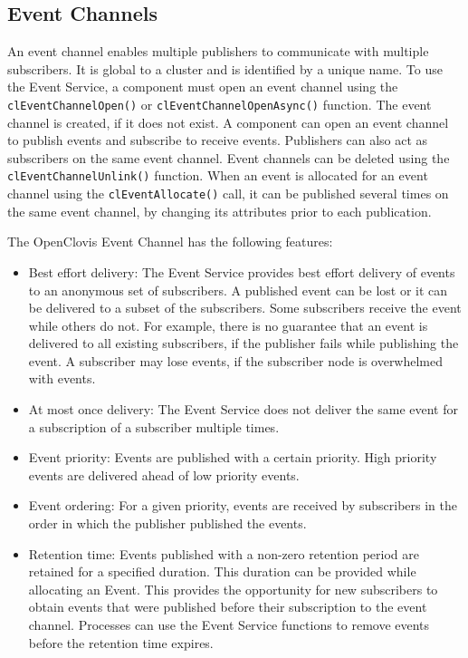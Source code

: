 \begin{flushleft}
\subsection{Event Channels}
An event channel enables multiple publishers to communicate with multiple subscribers. It is global to a cluster and is identified by a unique name. To
use the Event Service, a component must open an event channel using the {\tt{clEventChannelOpen()}} or {\tt{clEventChannelOpenAsync()}} function. The 
event channel is created, if it does not exist. A component can open an event channel to publish events and subscribe to receive events. 
Publishers can also act as subscribers on the same event channel. Event channels can be deleted using the {\tt{clEventChannelUnlink()}} function. When an 
event is allocated for an event channel using the {\tt{clEventAllocate()}} call, it can be published several times on the same event channel, by changing
its attributes prior to each publication. 
\par
The OpenClovis Event Channel has the following features:
\begin{itemize}
\item
Best effort delivery: The Event Service provides best effort delivery of events to an anonymous set of subscribers. A published event can be lost or
it can be delivered to a subset of the subscribers. Some subscribers receive the event while others do not. For example, there is no guarantee that an
event is delivered to all existing subscribers, if the publisher fails while publishing the event. A subscriber may lose events, if the subscriber node
is overwhelmed with events.
\item
At most once delivery: The Event Service does not deliver the same event for a subscription of a subscriber multiple times.
\item
Event priority: Events are published with a certain priority. High priority events are delivered ahead of low priority events. 
\item
Event ordering: For a given priority, events are received by subscribers in the order in which the publisher published the events.
\item
Retention time: Events published with a non-zero retention period are retained for a specified duration. This duration can be provided while allocating 
an Event. This provides the opportunity for new subscribers to obtain events that were published before their subscription to the event channel. Processes can
use the Event Service functions to remove events before the retention time expires. 

\end{itemize}
\end{flushleft}
